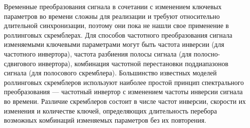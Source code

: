 Временные преобразования сигнала в сочетании с изменением ключевых параметров во времени сложны для реализации и требуют относительно длительной синхронизации, поэтому они пока не нашли свое применение в роллинговых скремблерах. Для способов частотного преобразования сигнала изменяемыми ключевыми параметрами могут быть частота инверсии (для частотного инвертора), частота разбиения полосы сигнала (для полосно-сдвигового инвертора), комбинация частотной перестановки поддиапазонов сигнала (для полосового скремблера). Большинство известных моделей роллинговых скремблеров используют наиболее простой принцип спектрального преобразования — частотный инвертор с изменением частоты инверсии сигнала во времени. Различие скремблеров состоит в числе частот инверсии, скорости их изменения и количестве ключей, определяющих длительность перебора возможных комбинаций изменяемых параметров без их повторения.






